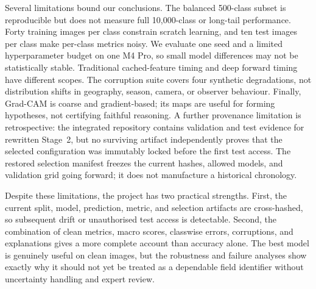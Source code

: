 Several limitations bound our conclusions.  The balanced 500-class subset is
reproducible but does not measure full 10,000-class or long-tail performance.
Forty training images per class constrain scratch learning, and ten test images
per class make per-class metrics noisy.  We evaluate one seed and a limited
hyperparameter budget on one M4 Pro, so small model differences may not be
statistically stable.  Traditional cached-feature timing and deep forward
timing have different scopes.  The corruption suite covers four synthetic
degradations, not distribution shifts in geography, season, camera, or
observer behaviour.  Finally, Grad-CAM is coarse and gradient-based; its maps
are useful for forming hypotheses, not certifying faithful reasoning.  A
further provenance limitation is retrospective: the integrated repository
contains validation and test evidence for rewritten Stage~2, but no surviving
artifact independently proves that the selected configuration was immutably
locked before the first test access.  The restored selection manifest freezes
the current hashes, allowed models, and validation grid going forward; it does
not manufacture a historical chronology.

Despite these limitations, the project has two practical strengths.  First,
the current split, model, prediction, metric, and selection artifacts are
cross-hashed, so subsequent drift or unauthorised test access is detectable.
Second,
the combination of clean metrics, macro scores, classwise errors, corruptions,
and explanations gives a more complete account than accuracy alone.  The
best model is genuinely useful on clean images, but the robustness and failure
analyses show exactly why it should not yet be treated as a dependable field
identifier without uncertainty handling and expert review.
